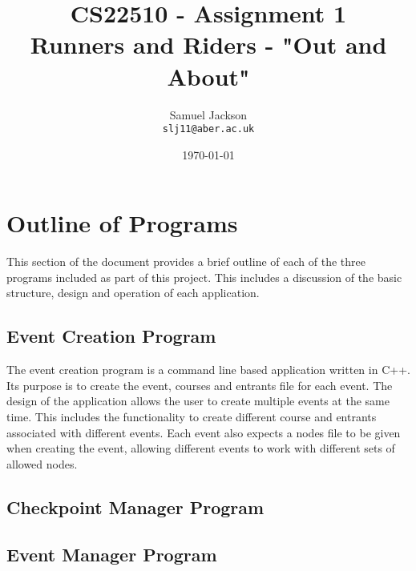 \documentclass{article}
\begin{document}
\title{CS22510 - Assignment 1 \\ Runners and Riders - "Out and About"}
\author{Samuel Jackson \\ \texttt{slj11@aber.ac.uk}}
\date{\today}
\maketitle

\section{Outline of Programs}
This section of the document provides a brief outline of each of the three programs included as part of this project. This includes a discussion of the basic structure, design and operation of each application.

\subsection{Event Creation Program}
The event creation program is a command line based application written in C++. Its purpose is to create the event, courses and entrants file for each event. The design of the application allows the user to create multiple events at the same time. This includes the functionality to create different course and entrants associated with different events. Each event also expects a nodes file to be given when creating the event, allowing different events to work with different sets of allowed nodes.

\subsection{Checkpoint Manager Program}

\subsection{Event Manager Program}
\end{document}
